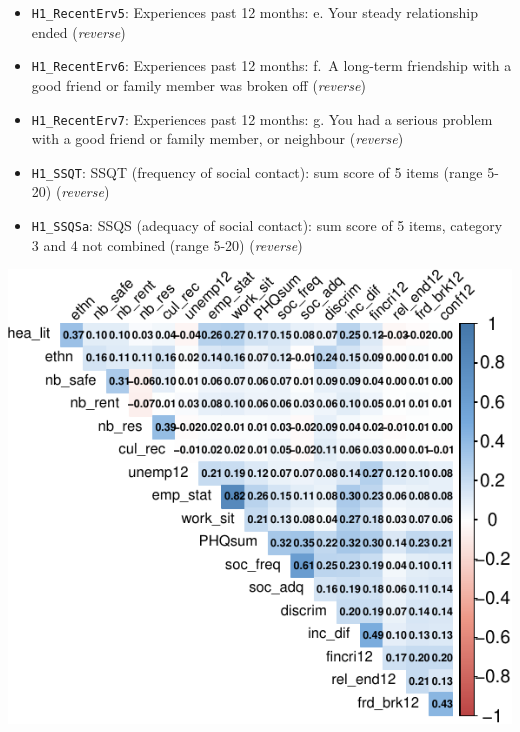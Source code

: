 \documentclass[
]{article}
\providecommand{\tightlist}{%
  \setlength{\itemsep}{0pt}\setlength{\parskip}{0pt}}\usepackage{longtable,booktabs,array}
\begin{document}
\begin{itemize}
\tightlist
\item
  \texttt{H1\_RecentErv5}: Experiences past 12 months: e. Your steady
  relationship ended (\emph{reverse})
\item
  \texttt{H1\_RecentErv6}: Experiences past 12 months: f.~A long-term
  friendship with a good friend or family member was broken off
  (\emph{reverse})
\item
  \texttt{H1\_RecentErv7}: Experiences past 12 months: g. You had a
  serious problem with a good friend or family member, or neighbour
  (\emph{reverse})
\item
  \texttt{H1\_SSQT}: SSQT (frequency of social contact): sum score of 5
  items (range 5-20) (\emph{reverse})
\item
  \texttt{H1\_SSQSa}: SSQS (adequacy of social contact): sum score of 5
  items, category 3 and 4 not combined (range 5-20) (\emph{reverse})
\end{itemize}

\begin{center}
\includegraphics{draft_v2_files/figure-pdf/unnamed-chunk-12-1.pdf}
\end{center}
\end{document}
